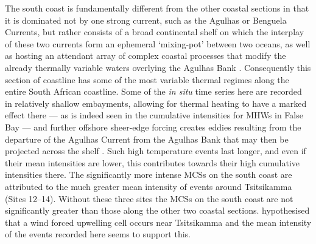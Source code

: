 \documentclass[a4paper,10pt,review]{elsarticle}
\begin{document}
The south coast is fundamentally different from the other coastal sections in that it is dominated not by one strong current, such as the Agulhas or Benguela Currents, but rather consists of a broad continental shelf on which the interplay of these two currents form an ephemeral `mixing-pot' between two oceans, as well as hosting an attendant array of complex coastal processes that modify the already thermally variable waters overlying the Agulhas Bank \citep{Lutjeharms2003, Roberts2005, Hutchings2009}. Consequently this section of coastline has some of the most variable thermal regimes along the entire South African coastline. Some of the \emph{in situ} time series here are recorded in relatively shallow embayments, allowing for thermal heating to have a marked effect there --- as is indeed seen in the cumulative intensities for MHWs in False Bay --- and further offshore sheer-edge forcing creates eddies resulting from the departure of the Agulhas Current from the Agulhas Bank that may then be projected across the shelf \citep{Lutjeharms2003}. Such high temperature events last longer, and even if their mean intensities are lower, this contributes towards their high cumulative intensities there. The significantly more intense MCSs on the south coast are attributed to the much greater mean intensity of events around Tsitsikamma (Sites 12--14). Without these three sites the MCSs on the south coast are not significantly greater than those along the other two coastal sections. \citep{Roberts2005} hypothesised that a wind forced upwelling cell occurs near Tsitsikamma and the mean intensity of the events recorded here seems to support this.
\end{document}
